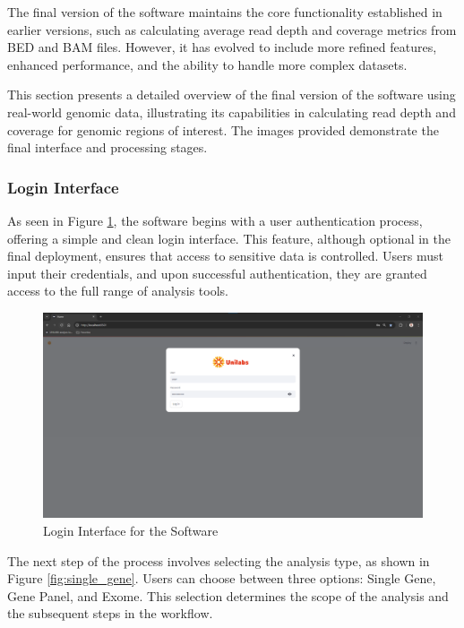 The final version of the software maintains the core functionality established in earlier versions, such as calculating average read depth and coverage metrics from BED and BAM files. However, it has evolved to include more refined features, enhanced performance, and the ability to handle more complex datasets.

This section presents a detailed overview of the final version of the software using real-world genomic data, illustrating its capabilities in calculating read depth and coverage for genomic regions of interest. The images provided demonstrate the final interface and processing stages.

\subsubsection{\textbf{Login Interface}}

As seen in Figure \ref{fig:login}, the software begins with a user authentication process, offering a simple and clean login interface. This feature, although optional in the final deployment, ensures that access to sensitive data is controlled. Users must input their credentials, and upon successful authentication, they are granted access to the full range of analysis tools.

\begin{figure}[H]
    \centering
    \includegraphics[width=\textwidth]{figs/v3.1.png}
    \caption{Login Interface for the Software}
    \label{fig:login}
\end{figure}

The next step of the process involves selecting the analysis type, as shown in Figure \ref{fig:single_gene}. Users can choose between three options: Single Gene, Gene Panel, and Exome. This selection determines the scope of the analysis and the subsequent steps in the workflow.


